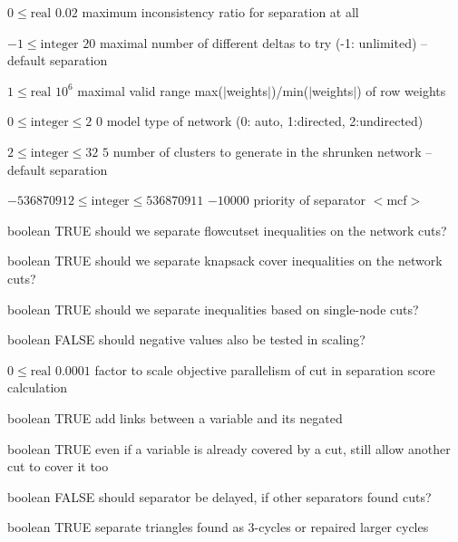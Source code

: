%
{$0\leq\textrm{real}$}%
{$0.02$}%
{maximum inconsistency ratio for separation at all}%
{}

%
{$-1\leq\textrm{integer}$}%
{$20$}%
{maximal number of different deltas to try (-1: unlimited)  -- default separation}%
{}

%
{$1\leq\textrm{real}$}%
{$10^{  6}$}%
{maximal valid range max($|$weights$|$)/min($|$weights$|$) of row weights}%
{}

%
{$0\leq\textrm{integer}\leq2$}%
{$0$}%
{model type of network (0: auto, 1:directed, 2:undirected)}%
{}

%
{$2\leq\textrm{integer}\leq32$}%
{$5$}%
{number of clusters to generate in the shrunken network -- default separation}%
{}

%
{$-536870912\leq\textrm{integer}\leq536870911$}%
{$-10000$}%
{priority of separator $<$mcf$>$}%
{}

%
{boolean}%
{TRUE}%
{should we separate flowcutset inequalities on the network cuts?}%
{}

%
{boolean}%
{TRUE}%
{should we separate knapsack cover inequalities on the network cuts?}%
{}

%
{boolean}%
{TRUE}%
{should we separate inequalities based on single-node cuts?}%
{}

%
{boolean}%
{FALSE}%
{should negative values also be tested in scaling?}%
{}

%
{$0\leq\textrm{real}$}%
{$0.0001$}%
{factor to scale objective parallelism of cut in separation score calculation}%
{}

%
{boolean}%
{TRUE}%
{add links between a variable and its negated}%
{}

%
{boolean}%
{TRUE}%
{even if a variable is already covered by a cut, still allow another cut to cover it too}%
{}

%
{boolean}%
{FALSE}%
{should separator be delayed, if other separators found cuts?}%
{}

%
{boolean}%
{TRUE}%
{separate triangles found as 3-cycles or repaired larger cycles}%
{}

